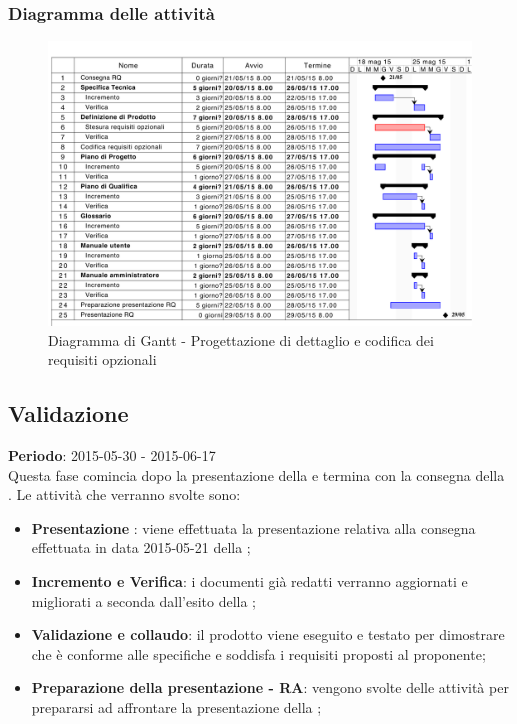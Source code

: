 		\subsubsection{Diagramma delle attività} %
		\label{ssub:diagramma_delle_attivita}
			\begin{figure}[htbp]
				\centering
				\centerline{\includegraphics[scale=0.7]{images/d_attivita_prog_dett_cod_opz.pdf}}
				\caption{Diagramma di Gantt - Progettazione di dettaglio e codifica dei requisiti opzionali}
				\label{fig:gantt_prog_dett_cod_requisiti_opzionali}
			\end{figure}
	
	\subsection{Validazione} %
	\label{sub:validazione}
	\textbf{Periodo}:  2015-05-30 - 2015-06-17 \\
	Questa fase comincia dopo la presentazione della \RQ{} e termina con la consegna della \RA.
	Le attività che verranno svolte sono:
		\begin{itemize}
			\item \textbf{Presentazione \RQ}: viene effettuata la presentazione relativa alla consegna effettuata in data 2015-05-21 della \RQ;
			\item \textbf{Incremento e Verifica}: i documenti già redatti verranno aggiornati e migliorati a seconda dall'esito della \RQ;
			\item \textbf{Validazione e collaudo}: il prodotto viene eseguito e testato per dimostrare che è conforme alle specifiche e soddisfa i requisiti proposti al proponente;
			\item \textbf{Preparazione della presentazione - RA}: vengono svolte delle attività per prepararsi ad affrontare la presentazione della \RA;
		\end{itemize}
		
